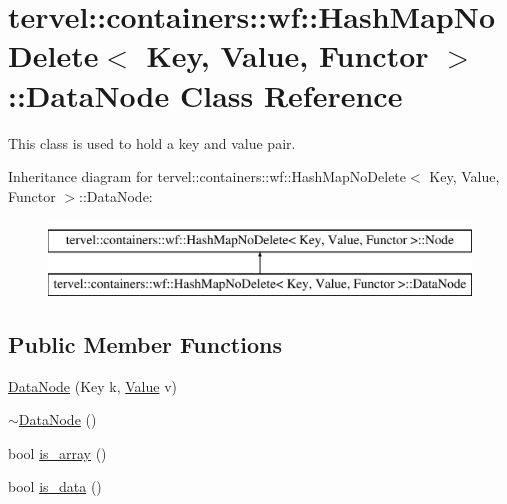 \hypertarget{classtervel_1_1containers_1_1wf_1_1_hash_map_no_delete_1_1_data_node}{}\section{tervel\+:\+:containers\+:\+:wf\+:\+:Hash\+Map\+No\+Delete$<$ Key, Value, Functor $>$\+:\+:Data\+Node Class Reference}
\label{classtervel_1_1containers_1_1wf_1_1_hash_map_no_delete_1_1_data_node}


This class is used to hold a key and value pair.  


Inheritance diagram for tervel\+:\+:containers\+:\+:wf\+:\+:Hash\+Map\+No\+Delete$<$ Key, Value, Functor $>$\+:\+:Data\+Node\+:\begin{figure}[H]
\begin{center}
\leavevmode
\includegraphics[height=2.000000cm]{classtervel_1_1containers_1_1wf_1_1_hash_map_no_delete_1_1_data_node}
\end{center}
\end{figure}
\subsection*{Public Member Functions}
\begin{DoxyCompactItemize}
\item 
\hyperlink{classtervel_1_1containers_1_1wf_1_1_hash_map_no_delete_1_1_data_node_a4cc9193f493ac699f609a8076eb47416}{Data\+Node} (Key k, \hyperlink{hash__map_2test_object_8h_ad777bf08d8e2b01df17ba5e3c51ae11f}{Value} v)
\item 
\hyperlink{classtervel_1_1containers_1_1wf_1_1_hash_map_no_delete_1_1_data_node_a52f4202ed5b4e8129e7820287bad90cd}{$\sim$\+Data\+Node} ()
\item 
bool \hyperlink{classtervel_1_1containers_1_1wf_1_1_hash_map_no_delete_1_1_data_node_a12ef4de7bec0bb237d2cb4f3eeab1a7d}{is\+\_\+array} ()
\item 
bool \hyperlink{classtervel_1_1containers_1_1wf_1_1_hash_map_no_delete_1_1_data_node_af8b10e3d6d939fd4655e92b884b160cf}{is\+\_\+data} ()
\end{DoxyCompactItemize}
